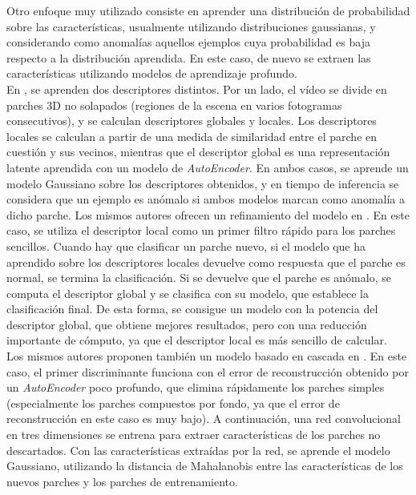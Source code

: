 \documentclass[../main.tex]{memoir}
\begin{document}
Otro enfoque muy utilizado consiste en aprender una distribución de
probabilidad sobre las características, usualmente utilizando
distribuciones gaussianas, y considerando como anomalías aquellos
ejemplos cuya probabilidad es baja respecto a la distribución
aprendida. En este caso, de nuevo se extraen las características
utilizando modelos de aprendizaje profundo.\\

En \cite{sabokrou2015real}, se aprenden dos descriptores distintos.
Por un lado, el vídeo se divide en parches 3D no solapados (regiones
de la escena en varios fotogramas consecutivos), y se calculan
descriptores globales y locales. Los descriptores locales se calculan
a partir de una medida de similaridad entre el parche en cuestión y
sus vecinos, mientras que el descriptor global es una representación
latente aprendida con un modelo de \textit{AutoEncoder}. En ambos
casos, se aprende un modelo Gaussiano sobre los descriptores
obtenidos, y en tiempo de inferencia se considera que un ejemplo es
anómalo si ambos modelos marcan como anomalía a dicho parche. Los
mismos autores ofrecen un refinamiento del modelo en
\cite{sabokrou2017fast}. En este caso, se utiliza el descriptor local
como un primer filtro rápido para los parches sencillos. Cuando hay
que clasificar un parche nuevo, si el modelo que ha aprendido sobre
los descriptores locales devuelve como respuesta que el parche es
normal, se termina la clasificación. Si se devuelve que el parche es
anómalo, se computa el descriptor global y se clasifica con su modelo,
que establece la clasificación final. De esta forma, se consigue un
modelo con la potencia del descriptor global, que obtiene mejores
resultados, pero con una reducción importante de cómputo, ya que el
descriptor local es más sencillo de calcular.\\

Los mismos autores proponen también un modelo basado en cascada en
\cite{sabokrou2017deep}. En este caso, el primer discriminante
funciona con el error de reconstrucción obtenido por un
\textit{AutoEncoder} poco profundo, que elimina rápidamente los
parches simples (especialmente los parches compuestos por fondo,
ya que el error de reconstrucción en este caso es muy bajo).
A continuación, una red convolucional en tres dimensiones se entrena
para extraer características de los parches no descartados. Con las
características extraídas por la red, se aprende el modelo Gaussiano,
utilizando la distancia de Mahalanobis entre las características
de los nuevos parches y los parches de entrenamiento.\\
\end{document}
